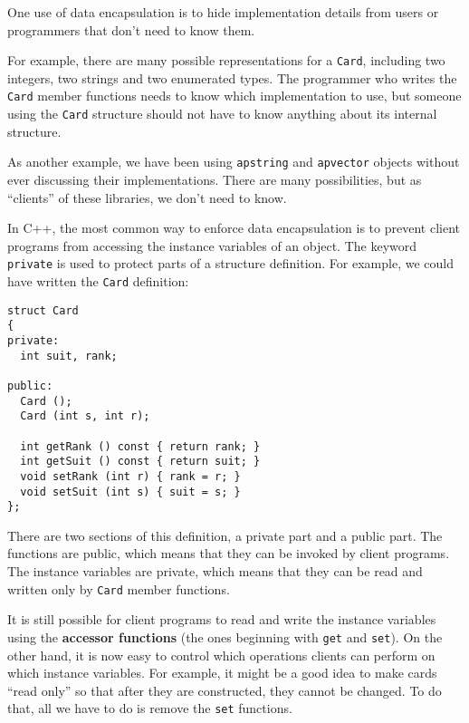 
One use of data encapsulation is to hide implementation details 
from users or programmers that don't need to know them.

For example, there are many possible representations for a {\tt Card},
including two integers, two strings and two enumerated types.  The
programmer who writes the {\tt Card} member functions needs to
know which implementation to use, but
someone using
the {\tt Card} structure should not have to know anything about
its internal structure.

As another example, we have been using {\tt apstring} and
{\tt apvector} objects without ever discussing their implementations.
There are many possibilities, but as ``clients'' of these
libraries, we don't need to know.


In C++, the most common way to enforce data encapsulation is
to prevent client programs from accessing the instance variables
of an object.  The keyword {\tt private} is used to protect parts
of a structure definition.  For example, we could have written
the {\tt Card} definition:

\begin{verbatim}
struct Card
{
private:
  int suit, rank;

public:
  Card ();
  Card (int s, int r);

  int getRank () const { return rank; }
  int getSuit () const { return suit; }
  void setRank (int r) { rank = r; }
  void setSuit (int s) { suit = s; }
};
\end{verbatim}
%
There are two sections of this definition, a private part and
a public part.  The functions are public, which means that they
can be invoked by client programs.  The instance variables are
private, which means that they can be read and written only by
{\tt Card} member functions.


It is still possible for client programs to read and
write the instance variables using the {\bf accessor functions}
(the ones beginning with {\tt get} and {\tt set}).
On the other hand, it is now easy to control which
operations clients can perform on which instance variables.
For example, it might be a good idea to make cards ``read only''
so that after they are constructed, they cannot be changed.
To do that, all we have to do is remove the {\tt set} functions.

